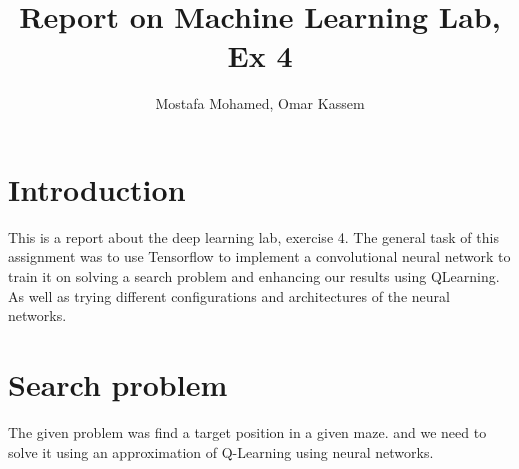\documentclass[a4paper]{article}
\begin{document}

\title{Report on Machine Learning Lab, Ex 4} %


\author{Mostafa Mohamed, Omar Kassem}%



\maketitle %




\section{Introduction}
This is a report about the deep learning lab, exercise 4. The general task of this assignment was to use Tensorflow to implement a convolutional neural network to train it on solving a search problem and enhancing our results using QLearning. As well as trying different configurations and architectures of the neural networks.

\section{Search problem}
The given problem was find a target position in a given maze. and we need to solve it using an approximation of Q-Learning using neural networks.
\end{document}
